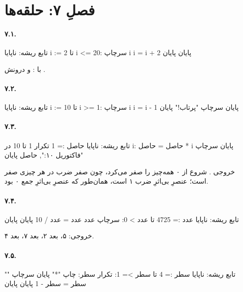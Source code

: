 \section*{فصلِ ۷: حلقه‌ها}

\paragraph{۷.۱.}
\begin{salamfa}
تابع ریشه:
    ناپایا i := 2
    تا i <= 20:
        سرچاپ i
        i = i + 2
    پایان
پایان
\end{salamfa}
با :  و درونش
.

\paragraph{۷.۲.}
\begin{salamfa}
تابع ریشه:
    ناپایا i := 10
    تا i >= 1:
        سرچاپ i
        i = i - 1
    پایان
    سرچاپ "پرتاب!"
پایان
\end{salamfa}

\paragraph{۷.۳.}
\begin{salamfa}
تابع ریشه:
    ناپایا حاصل := 1
    تکرار 1 تا 10 در i:
        حاصل = حاصل * i
    پایان
    سرچاپ "فاکتوریل ۱۰:", حاصل
پایان
\end{salamfa}
خروجی . شروع از ۰ همه‌چیز را صفر می‌کرد، چون صفر ضرب در
هر چیزی صفر است؛ عنصرِ بی‌اثرِ ضرب ۱ است، همان‌طور که عنصرِ بی‌اثرِ جمع
۰ بود.

\paragraph{۷.۴.}
\begin{salamfa}
تابع ریشه:
    ناپایا عدد := 4725
    تا عدد > 0:
        سرچاپ عدد %
        عدد = عدد / 10
    پایان
پایان
\end{salamfa}
خروجی: ۵، بعد ۲، بعد ۷، بعد ۴.

\paragraph{۷.۵.}
\begin{salamfa}
تابع ریشه:
    ناپایا سطر := 4
    تا سطر >= 1:
        تکرار سطر:
            چاپ "*"
        پایان
        سرچاپ ""
        سطر = سطر - 1
    پایان
پایان
\end{salamfa}

